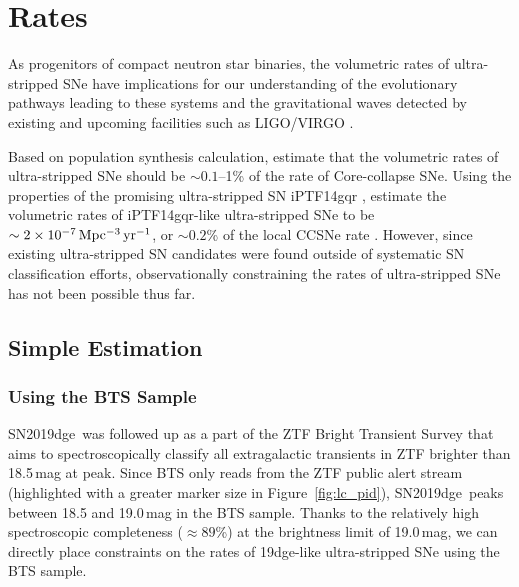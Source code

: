 \documentclass[twocolumn]{aastex63}
\newcommand{\name}{SN2019dge}
\begin{document}
\section{Rates} \label{sec:rates}
As progenitors of compact neutron star binaries, the volumetric rates 
of ultra-stripped SNe have implications for our understanding of the evolutionary pathways leading to 
these systems and the gravitational waves detected by existing and upcoming facilities such as 
LIGO/VIRGO \citep{GW170817}. 

Based on population synthesis calculation, \citet{Tauris2015} estimate 
that the volumetric rates of ultra-stripped SNe should be $\sim 0.1$--1\% of the rate of Core-collapse 
SNe. Using the properties of the promising ultra-stripped SN iPTF14gqr \citep{De2018}, 
\citet{Hijikawa2019} estimate the volumetric rates of iPTF14gqr-like ultra-stripped SNe to be $\sim 2 
\times 10^{-7}\,{\rm Mpc^{-3}\, yr^{-1}}$, or $\sim 0.2$\% of the local CCSNe rate 
\citep{Li2011a}. However, since existing ultra-stripped SN candidates were found outside of systematic 
SN classification efforts, observationally constraining the rates of ultra-stripped SNe has not been 
possible thus far. 

\subsection{Simple Estimation}
\subsubsection{Using the BTS Sample} \label{subsubsec:BTS}
\name\ was followed up as a part of the ZTF Bright Transient Survey 
\citep[BTS,][]{FremlingBTS2019} that aims to spectroscopically classify all extragalactic transients in 
ZTF brighter than 18.5\,mag at peak. Since BTS only reads from the ZTF public alert stream 
(highlighted with a greater marker size in Figure~\ref{fig:lc_pid}), \name\ peaks between 18.5 and 
19.0\,mag in the BTS sample. Thanks to the relatively high spectroscopic completeness ($\approx 
89$\%) at the brightness limit of 19.0\,mag, we can directly place constraints on the rates of 19dge-like 
ultra-stripped SNe using the BTS sample. 
\end{document}

